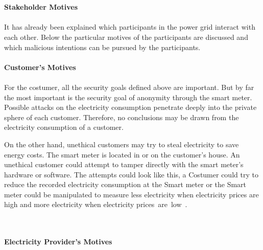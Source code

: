 \\
\\
\textbf{Stakeholder Motives}
\\
\\
It has already been explained which participants in the power grid interact with each other. %
Below the particular motives of the participants are discussed and which malicious intentions can be pursued by the participants.
\\
\\
\textbf{Customer's Motives}
\\
\\
For the costumer, all the security goals defined above are important. But by far the most important is the security goal of anonymity through the smart meter. Possible attacks on the electricity consumption penetrate deeply into the private sphere of each customer. Therefore, no conclusions may be drawn from the electricity consumption of a customer.\\
\begin{samepage}\enlargethispage{\baselineskip} On the other hand, unethical customers may try to steal electricity to save energy costs. The smart meter is located in or on the customer's house. An unethical customer could attempt to tamper directly with the smart meter's hardware or software. The attempts could look like this, a Costumer could try to reduce the recorded electricity consumption at the Smart meter or the Smart meter could be manipulated to measure less electricity when electricity prices are high and more electricity when electricity \nopagebreak prices~are~low~\cite{lemay2007unified}.\nopagebreak
\end{samepage}
\\
\\
\textbf{Electricity Provider's Motives}
\\
\\
